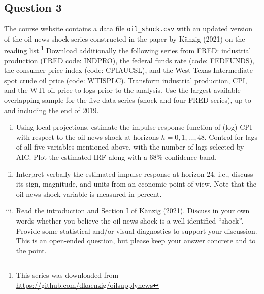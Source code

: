 \documentclass[12pt]{article}
\theoremstyle{plain}
\begin{document}
\subsection*{Question 3}
The course website contains a data file \texttt{oil\_shock.csv} with an updated version of the oil news shock series constructed in the paper by K\"{a}nzig (2021) on the reading list.\footnote{This series was downloaded from \url{https://github.com/dkaenzig/oilsupplynews}} Download additionally the following series from FRED: industrial production (FRED code: INDPRO), the federal funds rate (code: FEDFUNDS), the consumer price index (code: CPIAUCSL), and the West Texas Intermediate spot crude oil price (code: WTISPLC). Transform industrial production, CPI, and the WTI oil price to logs prior to the analysis. Use the largest available overlapping sample for the five data series (shock and four FRED series), up to and including the end of 2019.

\begin{enumerate}[i)]
\item Using local projections, estimate the impulse response function of (log) CPI with respect to the oil news shock at horizons $h=0,1,\dots,48$. Control for lags of all five variables mentioned above, with the number of lags selected by AIC. Plot the estimated IRF along with a 68\% confidence band.
\item Interpret verbally the estimated impulse response at horizon 24, i.e., discuss its sign, magnitude, and units from an economic point of view. Note that the oil news shock variable is measured in percent.
\item Read the introduction and Section I of K\"{a}nzig (2021). Discuss in your own words whether you believe the oil news shock is a well-identified ``shock''. Provide some statistical and/or visual diagnostics to support your discussion. This is an open-ended question, but please keep your answer concrete and to the point.
\end{enumerate}
\end{document}
